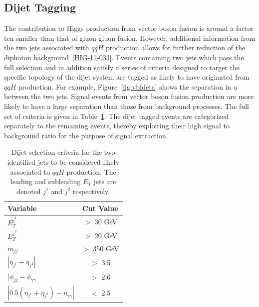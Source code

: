 \subsection{Dijet Tagging}
\label{sec:dijettagging}

The contribution to Higgs production from vector boson fusion is around a factor ten smaller than that
of gluon-gluon fusion. However, additional information from the two jets associated 
with $qqH$ production allows for further reduction of the diphoton background~\ref{HIG-11-033}.
Events containing two jets which pass the full selection and in addition
satisfy a series of criteria designed to target the specific topology of the dijet system are 
tagged as likely to have originated from $qqH$ production. For example, Figure~\ref{fig:vbfdeta} shows the 
separation in $\eta$ between the two jets. Signal events from vector boson fusion production are
more likely to have a large separation than those from background processes. The full set of 
criteria is given in Table~\ref{tab:vbfcuts}.
The dijet tagged events are categorized separately to 
the remaining events, thereby exploiting their high signal to background ratio for the purpose of signal
extraction. 

\begin{table}
\begin{tabular}{|l|c|}
\hline
\textbf{Variable} & \textbf{Cut Value} \\
\hline
\hline
$E_{T}^{j^{1}}$ & $>$ 30 GeV \\
$E_{T}^{j^{2}}$ & $>$ 20 GeV \\
$m_{jj}$ 	 & $>$ 350 GeV \\
$|\eta_{j^{1}} - \eta_{j^{2}}|$ & $>$ 3.5 \\
$|\phi_{jj} - \phi_{\gamma\gamma}$ & $>$ 2.6 \\
$|0.5(\eta_{j^{1}} + \eta_{j^{2}}) - \eta_{\gamma\gamma}|$ & $<$ 2.5 \\
\hline
\end{tabular}
\label{tab:vbfcuts}
\caption{Dijet selection criteria for the two identified jets
to be considered likely associated to $qqH$ production. The leading and subleading $E_{T}$ jets
are denoted $j^{1}$ and $j^{2}$ respectively.}
\end{table}

